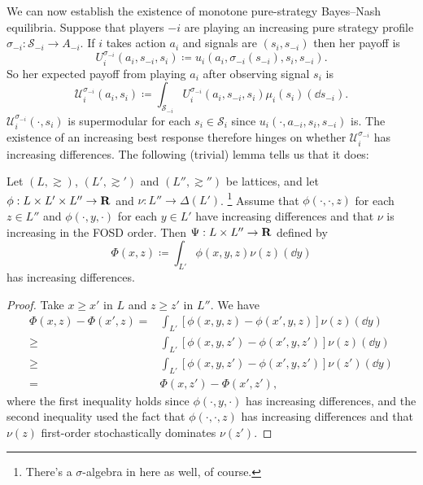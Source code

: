 \documentclass[11pt,letterpaper,reqno,oneside]{article}
\begin{document}
We can now establish the existence of monotone pure-strategy Bayes--Nash equilibria. Suppose that players $-i$ are playing an increasing pure strategy profile $\sigma_{-i} : \mathcal{S}_{-i} \to A_{-i}$. If $i$ takes action $a_i$ and signals are $(s_i,s_{-i})$ then her payoff is
%
\begin{equation*}
	U_i^{\sigma_{-i}}( a_i, s_{-i}, s_i )
	\coloneqq u_i( a_i, \sigma_{-i}(s_{-i}), s_i, s_{-i} ) .
\end{equation*}
%
So her expected payoff from playing $a_i$ after observing signal $s_i$ is
%
\begin{equation*}
	\mathcal{U}_i^{\sigma_{-i}}( a_i, s_i )
	\coloneqq \int_{\mathcal{S}_{-i}} U_i^{\sigma_{-i}}( a_i, s_{-i}, s_i ) 
	\mu_i(s_i)( \dd s_{-i} ) .
\end{equation*}
%
$\mathcal{U}_i^{\sigma_{-i}}( \cdot, s_i )$ is supermodular for each $s_i \in \mathcal{S}_i$ since $u_i(\cdot,a_{-i},s_i,s_{-i})$ is. The existence of an increasing best response therefore hinges on whether $\mathcal{U}_i^{\sigma_{-i}}$ has increasing differences. The following (trivial) lemma tells us that it does:
%
\begin{lemma}
	\label{lemma:ID_FOSD_preserved}
	Let $(L,\gtrsim)$, $(L',\gtrsim')$ and $(L'',\gtrsim'')$ be lattices, and let $\phi : L \times L' \times L'' \to \mathbf{R}$ and $\nu : L'' \to \Delta(L')$.%
		\footnote{There's a $\sigma$-algebra in here as well, of course.}
	Assume that $\phi(\cdot,\cdot,z)$ for each $z \in L''$ and $\phi(\cdot,y,\cdot)$ for each $y \in L'$ have increasing differences and that $\nu$ is increasing in the FOSD order. Then $\Psi : L \times L'' \to \mathbf{R}$ defined by
	\begin{equation*}
		\Phi(x,z) \coloneqq \int_{L'} \phi(x,y,z) \nu(z)( \dd y )
	\end{equation*}
	has increasing differences.	
\end{lemma}

\begin{proof}
	Take $x \geq x'$ in $L$ and $z \geq z'$ in $L''$. We have
	\begin{align*}
		\Phi(x,z) - \Phi(x',z)
		={}& \int_{L'} \left[ \phi(x,y,z) - \phi(x',y,z) \right] \nu(z)(\dd y)
		\\
		\geq{}& \int_{L'} \left[ \phi(x,y,z') - \phi(x',y,z') \right] \nu(z)(\dd y)
		\\
		\geq{}& \int_{L'} \left[ \phi(x,y,z') - \phi(x',y,z') \right] \nu(z')(\dd y)
		\\
		={}& \Phi(x,z') - \Phi(x',z') ,
	\end{align*}
	where the first inequality holds since $\phi(\cdot,y,\cdot)$ has increasing differences, and the second inequality used the fact that $\phi(\cdot,\cdot,z)$ has increasing differences and that $\nu(z)$ first-order stochastically dominates $\nu(z')$.
\end{proof}
\end{document}
